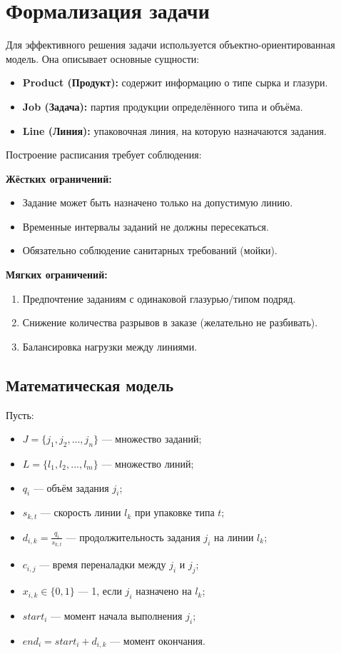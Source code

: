 \section{Формализация задачи}

Для эффективного решения задачи используется объектно-ориентированная модель. Она описывает основные сущности:

\begin{itemize}
    \item \textbf{Product (Продукт):} содержит информацию о типе сырка и глазури.
    \item \textbf{Job (Задача):} партия продукции определённого типа и объёма.
    \item \textbf{Line (Линия):} упаковочная линия, на которую назначаются задания.
\end{itemize}

Построение расписания требует соблюдения:

\textbf{Жёстких ограничений:}
\begin{itemize}
    \item Задание может быть назначено только на допустимую линию.
    \item Временные интервалы заданий не должны пересекаться.
    \item Обязательно соблюдение санитарных требований (мойки).
\end{itemize}

\textbf{Мягких ограничений:}
\begin{enumerate}
    \item Предпочтение заданиям с одинаковой глазурью/типом подряд.
    \item Снижение количества разрывов в заказе (желательно не разбивать).
    \item Балансировка нагрузки между линиями.
\end{enumerate}

\subsection{Математическая модель}

Пусть:

\begin{itemize}
    \item $J = \{j_1, j_2, ..., j_n\}$ — множество заданий;
    \item $L = \{l_1, l_2, ..., l_m\}$ — множество линий;
    \item $q_i$ — объём задания $j_i$;
    \item $s_{k,t}$ — скорость линии $l_k$ при упаковке типа $t$;
    \item $d_{i,k} = \frac{q_i}{s_{k,t}}$ — продолжительность задания $j_i$ на линии $l_k$;
    \item $c_{i,j}$ — время переналадки между $j_i$ и $j_j$;
    \item $x_{i,k} \in \{0,1\}$ — 1, если $j_i$ назначено на $l_k$;
    \item $start_i$ — момент начала выполнения $j_i$;
    \item $end_i = start_i + d_{i,k}$ — момент окончания.
\end{itemize}

